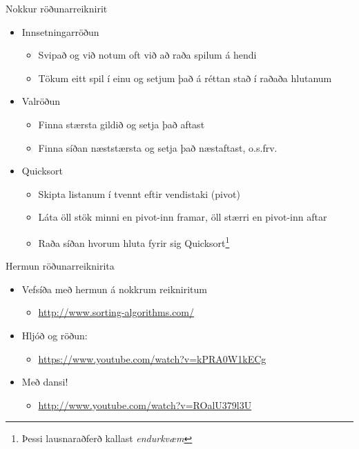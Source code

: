 \documentclass[handout]{beamer}
\begin{document}
\begin{frame}{Nokkur röðunarreiknirit}
\begin{itemize}
 \item Innsetningarröðun
 \begin{itemize}
  \item Svipað og við notum oft við að raða spilum á hendi
  \item Tökum eitt spil í einu og setjum það á réttan stað í raðaða hlutanum
 \end{itemize}
 \item Valröðun
 \begin{itemize}
  \item Finna stærsta gildið og setja það aftast
  \item Finna síðan næststærsta og setja það næstaftast, o.s.frv.
 \end{itemize}
 \item Quicksort
 \begin{itemize}
  \item Skipta listanum í tvennt eftir vendistaki (pivot)
  \item Láta öll stök minni en pivot-inn framar, öll stærri en pivot-inn aftar
  \item Raða síðan hvorum hluta fyrir sig Quicksort\footnote{Þessi lausnaraðferð kallast \emph{endurkvæm}}
 \end{itemize}
\end{itemize}
\end{frame}

\begin{frame}{Hermun röðunarreiknirita}
\begin{itemize}
 \item Vefsíða með hermun á nokkrum reikniritum
 \begin{itemize}
  \item \url{http://www.sorting-algorithms.com/}
 \end{itemize}
 \item Hljóð og röðun:
 \begin{itemize}
  \item \url{https://www.youtube.com/watch?v=kPRA0W1kECg}
 \end{itemize}
 \item Með dansi!
 \begin{itemize}
  \item \url{http://www.youtube.com/watch?v=ROalU379l3U}
 \end{itemize}
\end{itemize}
\end{frame}
\end{document}
